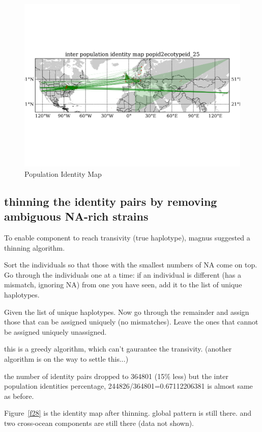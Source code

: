 \documentclass[a4paper,10pt]{article}
\begin{document}
\begin{figure}
\includegraphics[width=1\textwidth]{figures/identity_map1_site_network.png}
\caption{Population Identity Map}\label{f22}
\end{figure}


\subsection{thinning the identity pairs by removing ambiguous NA-rich strains}
To enable component to reach transivity (true haplotype), magnus suggested a thinning algorithm.

Sort the individuals so that those with the smallest numbers of NA come on top.  Go through the individuals one at a time: if an individual is different (has a mismatch, ignoring NA) from one you have seen, add it to the list of unique haplotypes.

Given the list of unique haplotypes. Now go through the remainder and assign those that can be assigned uniquely (no mismatches).  Leave the ones that cannot be assigned uniquely unassigned.

this is a greedy algorithm, which can't gaurantee the transivity. (another algorithm is on the way to settle this...)

the number of identity pairs dropped to 364801 (15\% less) but the inter population identities percentage, 244826/364801=0.67112206381 is almost same as before.

Figure~\ref{f28} is the identity map after thinning. global pattern is still there. and two cross-ocean components are still there (data not shown).
\end{document}
